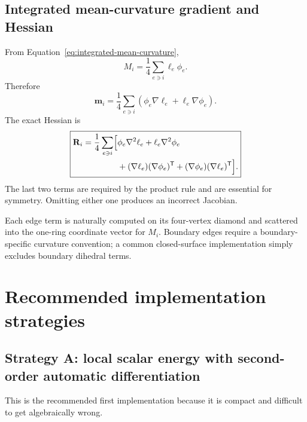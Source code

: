 \documentclass[11pt]{article}
\newcommand{\T}{\mathsf{T}}
\newcommand{\grad}{\nabla}
\newcommand{\Hess}{\nabla^2}
\newcommand{\mV}{\mathbf{m}}
\newcommand{\Mmat}{\mathbf{R}}
\begin{document}
\subsection{Integrated mean-curvature gradient and Hessian}

From Equation~\eqref{eq:integrated-mean-curvature},
\begin{equation}
  M_i=\frac{1}{4}\sum_{e\ni i}\ell_e\phi_e.
\end{equation}
Therefore
\begin{equation}
  \boxed{
  \mV_i
  =\frac{1}{4}\sum_{e\ni i}
    \left(
      \phi_e\grad\ell_e
      +\ell_e\grad\phi_e
    \right).}
  \label{eq:M-gradient}
\end{equation}
The exact Hessian is
\begin{equation}
  \boxed{\begin{aligned}
  \Mmat_i
  =\frac{1}{4}\sum_{e\ni i}\Bigl[
     &\phi_e\Hess\ell_e
      +\ell_e\Hess\phi_e
  \\
     &+(\grad\ell_e)(\grad\phi_e)^\T
      +(\grad\phi_e)(\grad\ell_e)^\T
  \Bigr].
  \end{aligned}}
  \label{eq:M-hessian}
\end{equation}
The last two terms are required by the product rule and are essential for symmetry.  Omitting either one produces an incorrect Jacobian.

Each edge term is naturally computed on its four-vertex diamond and scattered into the one-ring coordinate vector for $M_i$.  Boundary edges require a boundary-specific curvature convention; a common closed-surface implementation simply excludes boundary dihedral terms.

\section{Recommended implementation strategies}

\subsection{Strategy A: local scalar energy with second-order automatic differentiation}

This is the recommended first implementation because it is compact and difficult to get algebraically wrong.
\end{document}

